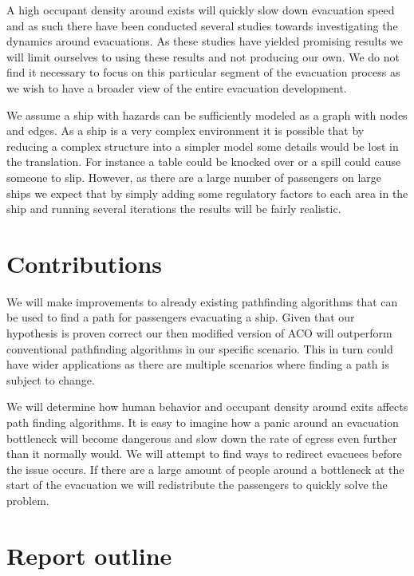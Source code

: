 A high occupant density around exists will quickly slow down evacuation speed and as such there have been conducted several studies
towards investigating the dynamics around evacuations. As these studies have yielded promising results we will
limit ourselves to using these results and not producing our own. We do not find it necessary to focus on this particular segment 
of the evacuation process as we wish to have a broader view of the entire evacuation development.

We assume a ship with hazards can be sufficiently modeled as a graph with nodes and edges. As a ship is a very complex
environment it is possible that by reducing a complex structure into a simpler model some details would be lost in the
translation. For instance a table could be knocked over or a spill could cause someone to slip. However, as there are a large number of 
passengers on large ships we expect that by simply adding some regulatory factors to each area in the ship and running
several iterations the results will be fairly realistic.

\section{Contributions}

 We will make improvements to already existing pathfinding algorithms that can be used to find a path 
for passengers evacuating a ship. Given that our hypothesis is proven
correct our then modified version of ACO will outperform conventional pathfinding algorithms in our 
specific scenario. This in turn could have wider applications as there are multiple scenarios
where finding a path is subject to change. 

We will determine how human behavior and occupant density around exits affects path finding algorithms.
It is easy to imagine how a panic around an evacuation bottleneck will become dangerous and slow
down the rate of egress even further than it normally would. We will attempt to find ways to redirect
evacuees before the issue occurs. If there are a large amount of people around a bottleneck at the
start of the evacuation we will redistribute the passengers to quickly solve the problem.


\section{Report outline}

